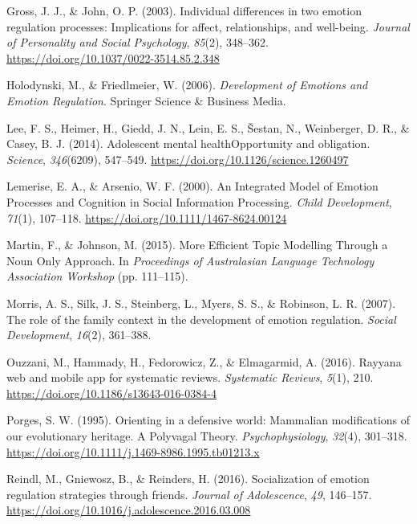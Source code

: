 \documentclass[
  english,
  man]{apa6}
\begin{document}
\leavevmode\hypertarget{ref-grossIndividualDifferencesTwo2003a}{}%
Gross, J. J., \& John, O. P. (2003). Individual differences in two emotion regulation processes: Implications for affect, relationships, and well-being. \emph{Journal of Personality and Social Psychology}, \emph{85}(2), 348--362. \url{https://doi.org/10.1037/0022-3514.85.2.348}

\leavevmode\hypertarget{ref-holodynskiDevelopmentEmotionsEmotion2006}{}%
Holodynski, M., \& Friedlmeier, W. (2006). \emph{Development of Emotions and Emotion Regulation}. Springer Science \& Business Media.

\leavevmode\hypertarget{ref-leeAdolescentMentalHealth2014}{}%
Lee, F. S., Heimer, H., Giedd, J. N., Lein, E. S., Šestan, N., Weinberger, D. R., \& Casey, B. J. (2014). Adolescent mental healthOpportunity and obligation. \emph{Science}, \emph{346}(6209), 547--549. \url{https://doi.org/10.1126/science.1260497}

\leavevmode\hypertarget{ref-lemeriseIntegratedModelEmotion2000}{}%
Lemerise, E. A., \& Arsenio, W. F. (2000). An Integrated Model of Emotion Processes and Cognition in Social Information Processing. \emph{Child Development}, \emph{71}(1), 107--118. \url{https://doi.org/10.1111/1467-8624.00124}

\leavevmode\hypertarget{ref-martinMoreEfficientTopic2015}{}%
Martin, F., \& Johnson, M. (2015). More Efficient Topic Modelling Through a Noun Only Approach. In \emph{Proceedings of Australasian Language Technology Association Workshop} (pp. 111--115).

\leavevmode\hypertarget{ref-morrisRoleFamilyContext2007}{}%
Morris, A. S., Silk, J. S., Steinberg, L., Myers, S. S., \& Robinson, L. R. (2007). The role of the family context in the development of emotion regulation. \emph{Social Development}, \emph{16}(2), 361--388.

\leavevmode\hypertarget{ref-Ouzzani2016}{}%
Ouzzani, M., Hammady, H., Fedorowicz, Z., \& Elmagarmid, A. (2016). Rayyana web and mobile app for systematic reviews. \emph{Systematic Reviews}, \emph{5}(1), 210. \url{https://doi.org/10.1186/s13643-016-0384-4}

\leavevmode\hypertarget{ref-porgesOrientingDefensiveWorld1995}{}%
Porges, S. W. (1995). Orienting in a defensive world: Mammalian modifications of our evolutionary heritage. A Polyvagal Theory. \emph{Psychophysiology}, \emph{32}(4), 301--318. \url{https://doi.org/10.1111/j.1469-8986.1995.tb01213.x}

\leavevmode\hypertarget{ref-reindlSocializationEmotionRegulation2016}{}%
Reindl, M., Gniewosz, B., \& Reinders, H. (2016). Socialization of emotion regulation strategies through friends. \emph{Journal of Adolescence}, \emph{49}, 146--157. \url{https://doi.org/10.1016/j.adolescence.2016.03.008}
\end{document}
